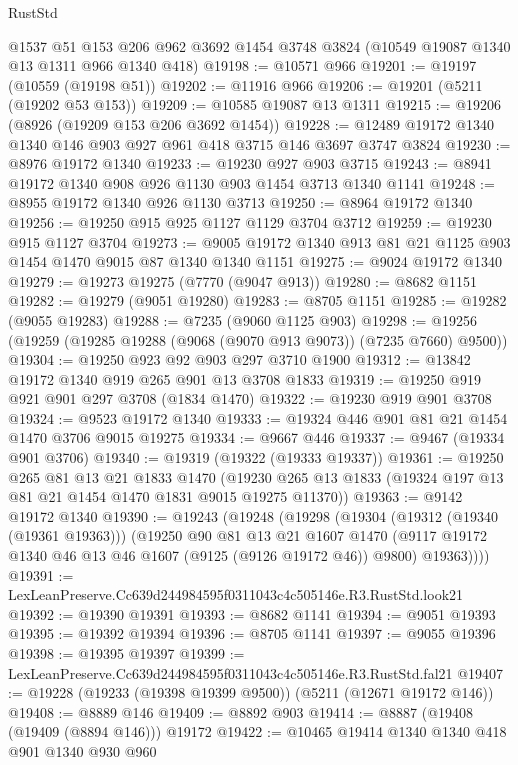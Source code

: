 \begin{lexlean}{RustStd}
\begin{coremodule}
    @1537
    @51
    @153
    @206
    @962
    @3692
    @1454
    @3748
    @3824
    (@10549 @19087 @1340 @13 @1311 @966 @1340 @418)
@19198 := @10571 @966
@19201 := @19197 (@10559 (@19198 @51))
@19202 := @11916 @966
@19206 := @19201 (@5211 (@19202 @53 @153))
@19209 := @10585 @19087 @13 @1311
@19215 := @19206 (@8926 (@19209 @153 @206 @3692 @1454))
@19228 := @12489 @19172 @1340 @1340 @146 @903 @927 @961 @418 @3715 @146 @3697 @3747 @3824
@19230 := @8976 @19172 @1340
@19233 := @19230 @927 @903 @3715
@19243 := @8941 @19172 @1340 @908 @926 @1130 @903 @1454 @3713 @1340 @1141
@19248 := @8955 @19172 @1340 @926 @1130 @3713
@19250 := @8964 @19172 @1340
@19256 := @19250 @915 @925 @1127 @1129 @3704 @3712
@19259 := @19230 @915 @1127 @3704
@19273 := @9005 @19172 @1340 @913 @81 @21 @1125 @903 @1454 @1470 @9015 @87 @1340 @1340 @1151
@19275 := @9024 @19172 @1340
@19279 := @19273 @19275 (@7770 (@9047 @913))
@19280 := @8682 @1151
@19282 := @19279 (@9051 @19280)
@19283 := @8705 @1151
@19285 := @19282 (@9055 @19283)
@19288 := @7235 (@9060 @1125 @903)
@19298 := @19256 (@19259 (@19285 @19288 (@9068 (@9070 @913 @9073)) (@7235 @7660) @9500))
@19304 := @19250 @923 @92 @903 @297 @3710 @1900
@19312 := @13842 @19172 @1340 @919 @265 @901 @13 @3708 @1833
@19319 := @19250 @919 @921 @901 @297 @3708 (@1834 @1470)
@19322 := @19230 @919 @901 @3708
@19324 := @9523 @19172 @1340
@19333 := @19324 @446 @901 @81 @21 @1454 @1470 @3706 @9015 @19275
@19334 := @9667 @446
@19337 := @9467 (@19334 @901 @3706)
@19340 := @19319 (@19322 (@19333 @19337))
@19361 := @19250
    @265
    @81
    @13
    @21
    @1833
    @1470
    (@19230 @265 @13 @1833 (@19324 @197 @13 @81 @21 @1454 @1470 @1831 @9015 @19275 @11370))
@19363 := @9142 @19172 @1340
@19390 := @19243
    (@19248
      (@19298
        (@19304
          (@19312 (@19340 (@19361 @19363)))
          (@19250
            @90
            @81
            @13
            @21
            @1607
            @1470
            (@9117 @19172 @1340 @46 @13 @46 @1607 (@9125 (@9126 @19172 @46)) @9800)
            @19363))))
@19391 := LexLeanPreserve.Cc639d244984595f0311043c4c505146e.R3.RustStd.look21
@19392 := @19390 @19391
@19393 := @8682 @1141
@19394 := @9051 @19393
@19395 := @19392 @19394
@19396 := @8705 @1141
@19397 := @9055 @19396
@19398 := @19395 @19397
@19399 := LexLeanPreserve.Cc639d244984595f0311043c4c505146e.R3.RustStd.fal21
@19407 := @19228 (@19233 (@19398 @19399 @9500)) (@5211 (@12671 @19172 @146))
@19408 := @8889 @146
@19409 := @8892 @903
@19414 := @8887 (@19408 (@19409 (@8894 @146))) @19172
@19422 := @10465 @19414 @1340 @1340 @418 @901 @1340 @930 @960

\end{coremodule}
\end{lexlean}
